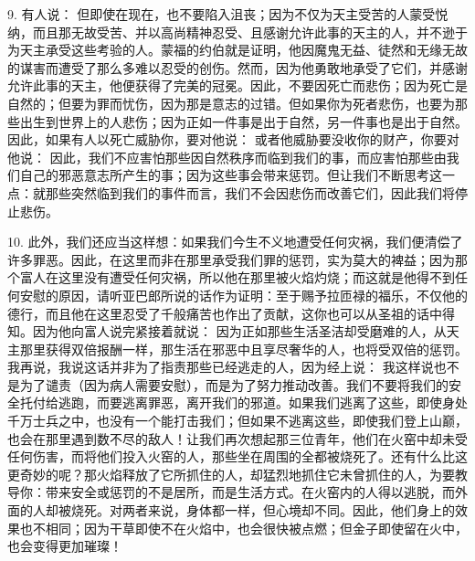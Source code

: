 9. 有人说： 但即使在现在，也不要陷入沮丧；因为不仅为天主受苦的人蒙受悦纳，而且那无故受苦、并以高尚精神忍受、且感谢允许此事的天主的人，并不逊于为天主承受这些考验的人。蒙福的约伯就是证明，他因魔鬼无益、徒然和无缘无故的谋害而遭受了那么多难以忍受的创伤。然而，因为他勇敢地承受了它们，并感谢允许此事的天主，他便获得了完美的冠冕。因此，不要因死亡而悲伤；因为死亡是自然的；但要为罪而忧伤，因为那是意志的过错。但如果你为死者悲伤，也要为那些出生到世界上的人悲伤；因为正如一件事是出于自然，另一件事也是出于自然。因此，如果有人以死亡威胁你，要对他说：  或者他威胁要没收你的财产，你要对他说：  因此，我们不应害怕那些因自然秩序而临到我们的事，而应害怕那些由我们自己的邪恶意志所产生的事；因为这些事会带来惩罚。但让我们不断思考这一点：就那些突然临到我们的事件而言，我们不会因悲伤而改善它们，因此我们将停止悲伤。\par

10. 此外，我们还应当这样想：如果我们今生不义地遭受任何灾祸，我们便清偿了许多罪恶。因此，在这里而非在那里承受我们罪的惩罚，实为莫大的裨益；因为那个富人在这里没有遭受任何灾祸，所以他在那里被火焰灼烧；而这就是他得不到任何安慰的原因，请听亚巴郎所说的话作为证明：\newline{}至于赐予拉匝禄的福乐，不仅他的德行，而且他在这里忍受了千般痛苦也作出了贡献，这你也可以从圣祖的话中得知。因为他向富人说完紧接着就说： \newline{}因为正如那些生活圣洁却受磨难的人，从天主那里获得双倍报酬一样，那生活在邪恶中且享尽奢华的人，也将受双倍的惩罚。我再说，我说这话并非为了指责那些已经逃走的人，因为经上说： \newline{}我这样说也不是为了谴责（因为病人需要安慰），而是为了努力推动改善。我们不要将我们的安全托付给逃跑，而要逃离罪恶，离开我们的邪道。如果我们逃离了这些，即使身处千万士兵之中，也没有一个能打击我们；但如果不逃离这些，即使我们登上山巅，也会在那里遇到数不尽的敌人！让我们再次想起那三位青年，他们在火窑中却未受任何伤害，而将他们投入火窑的人，那些坐在周围的全都被烧死了。还有什么比这更奇妙的呢？那火焰释放了它所抓住的人，却猛烈地抓住它未曾抓住的人，为要教导你：带来安全或惩罚的不是居所，而是生活方式。在火窑内的人得以逃脱，而外面的人却被烧死。对两者来说，身体都一样，但心境却不同。因此，他们身上的效果也不相同；因为干草即使不在火焰中，也会很快被点燃；但金子即使留在火中，也会变得更加璀璨！\par


